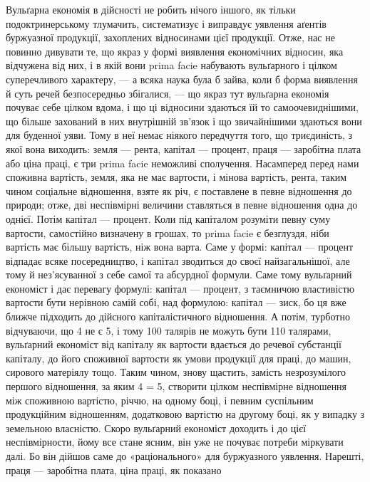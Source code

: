 Вульґарна економія в дійсності не робить нічого іншого, як тільки подоктринерському
тлумачить, систематизує і виправдує уявлення аґентів буржуазної
продукції, захоплених відносинами цієї продукції. Отже, нас не повинно
дивувати те, що якраз у формі виявлення економічних відносин, яка відчужена
від них, і в якій вони prima facie набувають вульґарного і цілком суперечливого
характеру, — а всяка наука була б зайва, коли б форма виявлення й суть
речей безпосередньо збігалися, — що якраз тут вульґарна економія почуває себе
цілком вдома, і що ці відносини здаються їй то самоочевиднішими, що більше
захований в них внутрішній зв’язок і що звичайнішими здаються вони для
буденної уяви. Тому в неї немає ніякого передчуття того, що триєдиність,
з якої вона виходить: земля — рента, капітал — процент, праця — заробітна плата
або ціна праці, є три prima facie неможливі сполучення. Насамперед перед
нами споживна вартість, земля, яка не має вартости, і мінова вартість, рента,
таким чином соціальне відношення, взяте як річ, є поставлене в певне
відношення до природи; отже, дві неспівмірні величини ставляться в певне
відношення одна до однієї. Потім капітал — процент. Коли під капіталом
розуміти певну суму вартости, самостійно визначену в грошах, то prima facie
є безглуздя, ніби вартість має більшу вартість, ніж вона варта. Саме у формі:
капітал — процент відпадає всяке посередництво, і капітал зводиться до своєї
найзагальнішої, але тому й нез’ясуванної з себе самої та абсурдної формули.
Саме тому вульґарний економіст і дає перевагу формулі: капітал — процент,
з таємничою властивістю вартости бути нерівною самій собі, над формулою:
капітал — зиск, бо ця вже ближче підходить до дійсного капіталістичного відношення.
А потім, турботно відчуваючи, що 4 не є 5, і тому 100 талярів не
можуть бути 110 талярами, вульґарний економіст від капіталу як вартости
вдається до речевої субстанції капіталу, до його споживної вартости як умови
продукції для праці, до машин, сирового матеріялу тощо. Таким чином, знову
щастить, замість незрозумілого першого відношення, за яким 4 = 5, створити
цілком неспівмірне відношення між споживною вартістю, річчю, на одному боці,
і певним суспільним продукційним відношенням, додатковою вартістю на другому
боці, як у випадку з земельною власністю. Скоро вульґарний економіст
доходить і до цієї неспівмірности, йому все стане ясним, він уже не почуває
потреби міркувати далі. Бо він дійшов саме до «раціонального» для буржуазного
уявлення. Нарешті, праця — заробітна плата, ціна праці, як показано
\parbreak{}  %
